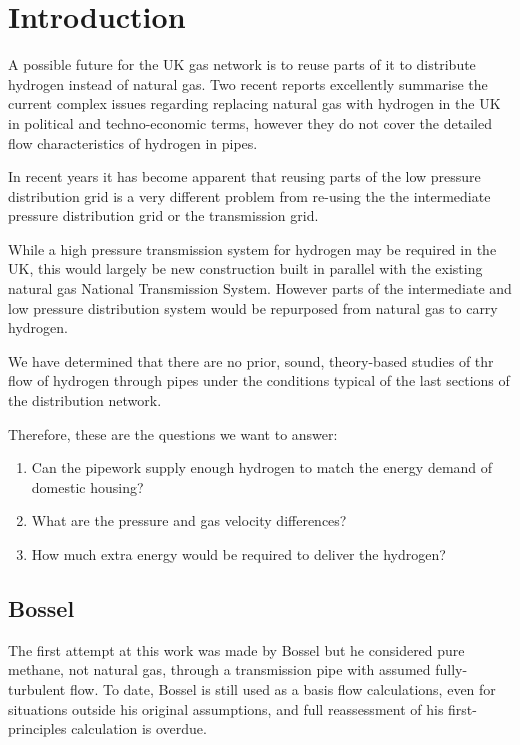 \documentclass[5p]{elsarticle} %
\begin{document}
\section{Introduction}

A possible future for the UK gas network is to reuse parts of it to distribute hydrogen instead of natural gas\citep{dodds2013}. Two recent reports\citep{RoyalAcademyofEngineering2022, ARUP2023} excellently summarise the current complex issues regarding replacing natural gas with hydrogen in the UK in political and techno-economic terms, however they do not cover the detailed flow characteristics of hydrogen in pipes.

In recent years it has become apparent that reusing parts of the low pressure distribution grid is a very different problem from re-using the the intermediate pressure distribution grid or the transmission grid\citep{H2Blends21,natgas2023}.

While a high pressure transmission system for hydrogen may be required in the UK\citep{Samsatli2019}, this would largely be new construction built in parallel with the existing natural gas National Transmission System. However parts of the intermediate and low pressure distribution system would be repurposed from natural gas to carry hydrogen. 

We have determined that there are no prior, sound, theory-based studies of thr flow of hydrogen through pipes under the conditions typical of the last sections of the distribution network.

Therefore, these are the questions we want to answer:
\begin{enumerate}
\item Can the pipework supply enough hydrogen to match the energy demand of domestic housing?
\item What are the pressure and gas velocity differences?
\item How much extra energy would be required to deliver the hydrogen?
\end{enumerate}

\subsection{Bossel}

The first attempt at 
this work 
was made by Bossel\citep{bossel2006} but he considered pure methane, not natural gas, through a transmission pipe with assumed fully-turbulent flow. To date, Bossel is still used\citep{Ibrahim2022} as a basis flow calculations, even for situations outside his original assumptions, and full reassessment of his first-principles calculation is overdue.
\end{document}
